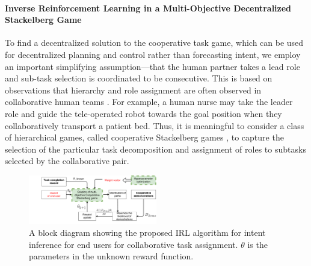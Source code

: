 \documentclass[letterpaper, 11 pt, onecolumn]{article}
\begin{document}

\paragraph*{Inverse Reinforcement Learning in a Multi-Objective Decentralized Stackelberg Game}
To find a decentralized solution to the cooperative task game, which can be used for decentralized planning and control rather than forecasting intent, we employ an important simplifying assumption---that the human partner takes a lead role and sub-task selection is coordinated to be consecutive. This is based on observations that 
hierarchy and role assignment are often observed in collaborative human teams \cite{mortl2012role,colman2014explaining}. For example, a human nurse may take the leader role and guide the tele-operated robot
towards the goal position when they collaboratively transport a patient bed. Thus, it is meaningful to consider a class of hierarchical games, called cooperative Stackelberg games \cite{basar1999dynamic}, to capture the selection of the particular task decomposition and assignment of roles to subtasks selected by the collaborative pair.

\begin{figure}
\vspace{-2ex}  \begin{center}
 \includegraphics[trim={3.0cm 0cm 0 0},clip, width=0.5\textwidth]{fig/IRL_game}
  \end{center}
  \vspace{-2.0ex}
  \caption{A block diagram showing the proposed IRL algorithm for intent inference for end users for collaborative task assignment. $\theta$ is the parameters in the unknown reward function.}
  \vspace{0.5ex}
  \end{figure}
\end{document}
